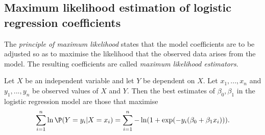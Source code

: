 \documentclass{article}
\begin{document}
\subsection{Maximum likelihood estimation of logistic regression coefficients}

\begin{definition}
	The \emph{principle of maximum likelihood} states that the model
	coefficients are to be adjusted so as to maximise the likelihood
	that the observed data arises from the model. The resulting coefficients
	are called \emph{maximum likelihood estimators}.
\end{definition}

\begin{theorem}
	Let $X$ be an independent variable and let $Y$ be dependent on $X$.
	Let $x_1,...,x_n$ and $y_1,...,y_n$ be observed values of $X$ and $Y$.
	Then the best estimates of $\beta_0,\beta_1$ in the logistic regression
	model are those that maximise
	\begin{align*}
		\sum_{i=1}^n\ln\P(Y=y_i|X=x_i) = \sum_{i=1}^n -\ln(1+\exp(-y_i(\beta_0+\beta_1x_i))).
	\end{align*}
\end{theorem}
\end{document}
